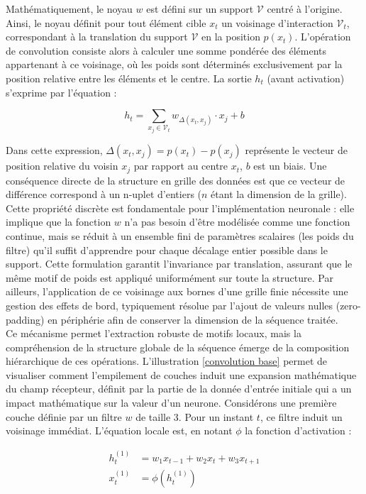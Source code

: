 Mathématiquement, le noyau $w$ est défini sur un support $\mathcal{V}$ centré à l'origine. Ainsi, le noyau définit pour tout élément cible $x_t$ un voisinage d'interaction $\mathcal{V}_t$, correspondant à la translation du support $\mathcal{V}$ en la position $p(x_t)$. L'opération de convolution consiste alors à calculer une somme pondérée des éléments appartenant à ce voisinage, où les poids sont déterminés exclusivement par la position relative entre les éléments et le centre. La sortie $h_t$ (avant activation) s'exprime par l'équation :

$$h_t = \sum_{x_j \in \mathcal{V}_t} w_{\Delta(x_t, x_j)} \cdot x_j + b$$

Dans cette expression, $\Delta(x_t, x_j) = p(x_t) - p(x_j)$ représente le vecteur de position relative du voisin $x_j$ par rapport au centre $x_t$, $b$ est un biais. Une conséquence directe de la structure en grille des données est que ce vecteur de différence correspond à un n-uplet d'entiers ($n$ étant la dimension de la grille). Cette propriété discrète est fondamentale pour l'implémentation neuronale : elle implique que la fonction $w$ n'a pas besoin d'être modélisée comme une fonction continue, mais se réduit à un ensemble fini de paramètres scalaires (les poids du filtre) qu'il suffit d'apprendre pour chaque décalage entier possible dans le support. Cette formulation garantit l'invariance par translation, assurant que le même motif de poids est appliqué uniformément sur toute la structure. Par ailleurs, l'application de ce voisinage aux bornes d'une grille finie nécessite une gestion des effets de bord, typiquement résolue par l'ajout de valeurs nulles (zero-padding) en périphérie afin de conserver la dimension de la séquence traitée.\\

Ce mécanisme permet l'extraction robuste de motifs locaux, mais la compréhension de la structure globale de la séquence émerge de la composition hiérarchique de ces opérations. L'illustration \ref{convolution base} permet de visualiser comment l'empilement de couches induit une expansion mathématique du champ récepteur, définit par la partie de la donnée d'entrée initiale qui a un impact mathématique sur la valeur d'un neurone. Considérons une première couche définie par un filtre $w$ de taille 3. Pour un instant $t$, ce filtre induit un voisinage immédiat. L'équation locale est, en notant $\phi$ la fonction d'activation :

\begin{equation*}
\begin{split}
	h^{(1)}_t &= w_{1}x_{t-1} + w_{2}x_{t} + w_{3}x_{t+1} \\
	x^{(1)}_t &= \phi(h^{(1)}_t)
\end{split}
\end{equation*}

